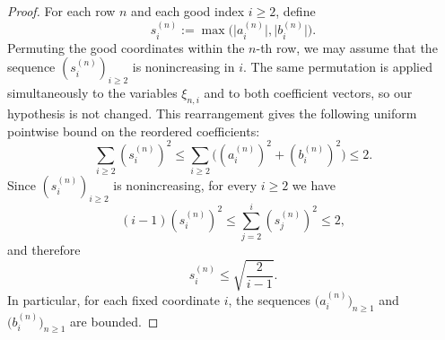 \documentclass[11pt]{amsart}
\numberwithin{equation}{section}
\theoremstyle{definition}
\theoremstyle{remark}
\newcommand{\abs}[1]{\lvert #1 \rvert}
\begin{document}
\begin{proof}
For each row $n$ and each good index $i\ge2$, define
\[
s_i^{(n)}:=\max\bigl(\abs{a_i^{(n)}},\abs{b_i^{(n)}}\bigr).
\]
Permuting the good coordinates within the $n$-th row, we may assume that the
sequence $(s_i^{(n)})_{i\ge2}$ is nonincreasing in $i$.  The same permutation
is applied simultaneously to the variables $\xi_{n,i}$ and to both coefficient
vectors, so our hypothesis is not changed.
This rearrangement gives the following uniform pointwise bound on the reordered
coefficients:
\[
\sum_{i\ge2}(s_i^{(n)})^2
\le
\sum_{i\ge2}\bigl((a_i^{(n)})^2+(b_i^{(n)})^2\bigr)
\le 2.
\]
Since $(s_i^{(n)})_{i\ge2}$ is nonincreasing, for every $i\ge2$ we have
\[
(i-1)(s_i^{(n)})^2
\le \sum_{j=2}^{i}(s_j^{(n)})^2
\le 2,
\]
and therefore
\[
s_i^{(n)}\le \sqrt{\frac{2}{i-1}}.
\]
In particular, for each fixed coordinate $i$, the sequences
$\bigl(a_i^{(n)}\bigr)_{n\ge1}$ and $\bigl(b_i^{(n)}\bigr)_{n\ge1}$ are
bounded.


\end{proof}
\end{document}
